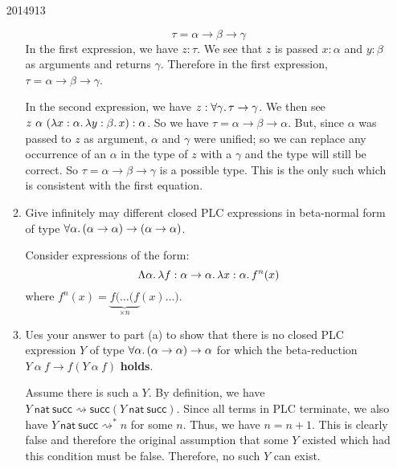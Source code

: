 \documentclass[10pt,\jkfside,a4paper]{article}
\begin{document}
\begin{enumerate}
\begin{examquestion}{2014}{9}{13}
\begin{enumerate}[label=(\alph*)]
            \[
                \tau = \alpha \to \beta \to \gamma
            \]
            In the first expression, we have $z: \tau$. We see that $z$ is passed $x: \alpha$ and $y: \beta$ as arguments and returns $\gamma$. Therefore in the first expression, $\tau = \alpha \to \beta \to \gamma$.

            In the second expression, we have $z: \forall \gamma\ldotp \tau \to \gamma$. We then see $z\ \alpha\ (\lambda x: \alpha\ldotp \lambda y: \beta\ldotp x): \alpha$.
            So we have $\tau = \alpha \to \beta \to \alpha$. But, since $\alpha$ was passed to $z$ as argument, $\alpha$ and $\gamma$ were unified; so we can replace any occurrence of an $\alpha$ in the type of
            $z$ with a $\gamma$ and the type will still be correct. So $\tau = \alpha \to \beta \to \gamma$ is a possible type. This is the only such which is consistent with the first equation.

            \item Give infinitely may different closed PLC expressions in beta-normal form of type $\forall \alpha\ldotp (\alpha \to \alpha) \to (\alpha \to \alpha)$.

            Consider expressions of the form:
            \[
                \Lambda \alpha \ldotp \lambda f: \alpha \to \alpha \ldotp \lambda x: \alpha \ldotp f^n(x)
            \]
            where $f^n(x) = \underbrace{f(\ldots(f}_{\times n}(x)\ldots)$.

            \item Ues your answer to part (a) to show that there is no closed PLC expression $Y$ of type $\forall \alpha \ldotp (\alpha \to \alpha) \to \alpha$ for which the beta-reduction
            $Y\ \alpha\ f \to f(Y\ \alpha\ f)$ \textbf{holds}.

            Assume there is such a $Y$. By definition, we have $Y\ \mathsf{nat}\ \mathsf{succ} \rightsquigarrow \mathsf{succ}(Y\ \mathsf{nat}\ \mathsf{succ})$. Since all terms in PLC terminate, we also have
            $Y\ \mathsf{nat}\ \mathsf{succ} \rightsquigarrow^* n$ for some $n$. Thus, we have $n = n + 1$. This is clearly false and therefore the original assumption that some $Y$ existed which had this
            condition must be false. Therefore, no such $Y$ can exist.

        \end{enumerate}

    \end{examquestion}

\end{enumerate}
\end{document}
